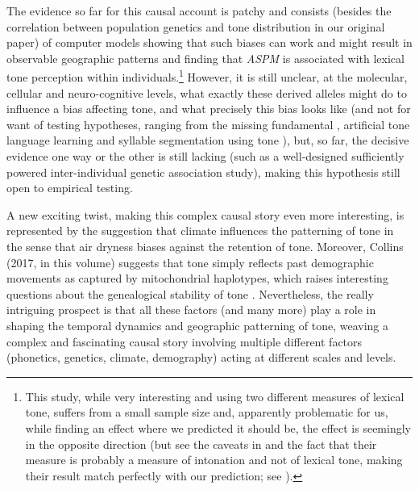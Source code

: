 \documentclass[output=paper]{langsci/langscibook}
\begin{document}
\largerpage
The evidence so far for this causal account is patchy and consists (besides the correlation between population genetics and tone distribution in our original paper) of computer models showing that such biases can work and might result in observable geographic patterns \citep[e.g.,][]{Dediu2008,Dediu2009} and  finding that \textit{ASPM} is associated with lexical tone perception within individuals.\footnote{This study, while very interesting and using two different measures of lexical tone, suffers from a small sample size and, apparently problematic for us, while finding an effect where we predicted it should be, the effect is seemingly in the opposite direction (but see the caveats in  and the fact that their measure is probably a measure of intonation and not of lexical tone, making their result match perfectly with our prediction; see \citealt{Caldwell-Harris2015}).} However, it is still unclear, at the molecular, cellular and neuro-cognitive levels, what exactly these derived alleles might do to influence a bias affecting tone, and what precisely this bias looks like (and not for want of testing hypotheses, ranging from the missing fundamental \citealt{Ladd2013}, artificial tone language learning \citealt{Asaridou2015} and syllable segmentation using tone \citealt{Caldwell-Harris2015}), but, so far, the decisive evidence one way or the other is still lacking (such as a well-designed sufficiently powered inter-individual genetic association study), making this hypothesis still open to empirical testing.

A new exciting twist, making this complex causal story even more interesting, is represented by the suggestion that climate  influences the patterning of tone \citep{Everett2015} in the sense that air dryness biases against the retention of tone. Moreover, Collins (2017, in this volume) suggests that tone simply reflects past demographic movements as captured by mitochondrial haplotypes, which raises interesting questions about the genealogical stability of tone \citep{Dediu2011a}. Nevertheless, the really intriguing prospect is that all these factors (and many more) play a role in shaping the temporal dynamics and geographic patterning of tone, weaving a complex and fascinating causal story involving multiple different factors (phonetics, genetics, climate, demography) acting at different scales and levels.
\end{document}
